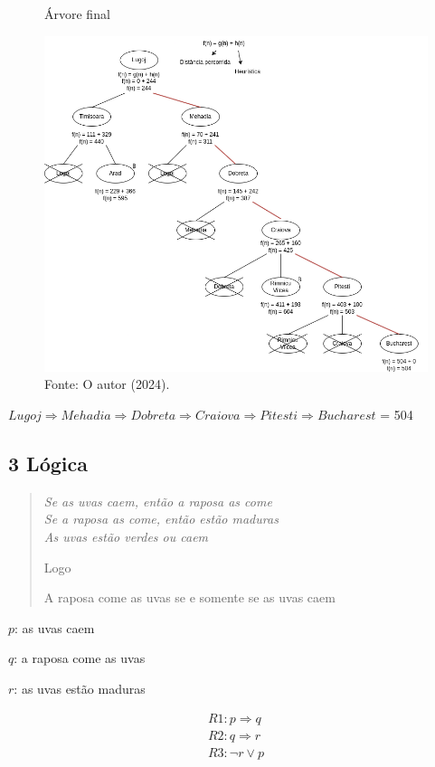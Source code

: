 \begin{figure}[H]
\centering
\caption{Árvore final}
\includegraphics[width=0.8\linewidth]{apendices/fig/1_IAA001_4.png}
\caption*{Fonte: O autor (2024).}
\label{arvoreF}
\end{figure}

$Lugoj \Rightarrow Mehadia \Rightarrow Dobreta \Rightarrow Craiova \Rightarrow Pitesti \Rightarrow Bucharest$ = 504

\subsection*{\textbf{3 Lógica}}
\begin{adjustwidth}{3em}{}
\begin{quote}
    \itshape
    Se as uvas caem, então a raposa as come \\
    Se a raposa as come, então estão maduras \\
    As uvas estão verdes ou caem

    Logo

    A raposa come as uvas se e somente se as uvas caem
\end{quote}
\end{adjustwidth}

$p$: as uvas caem 

$q$: a raposa come as uvas 

$r$: as uvas estão maduras

\begin{equation*}
    \begin{gathered}
        R1: p \Rightarrow q \\
        R2: q \Rightarrow r \\
        R3: \neg{r} \lor p \\
    \end{gathered}
\end{equation*}

